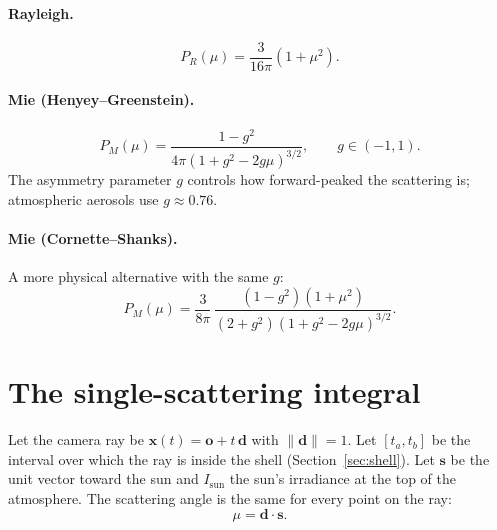\documentclass[11pt]{article}
\newcommand{\vect}[1]{\mathbf{#1}}
\begin{document}
\paragraph{Rayleigh.}
\begin{equation}
  P_R(\mu) = \frac{3}{16\pi}\left(1 + \mu^2\right).
  \label{eq:phase_rayleigh}
\end{equation}

\paragraph{Mie (Henyey--Greenstein).}
\begin{equation}
  P_M(\mu) = \frac{1 - g^2}{4\pi \left(1 + g^2 - 2 g \mu\right)^{3/2}},
  \qquad g \in (-1, 1).
  \label{eq:phase_hg}
\end{equation}
The asymmetry parameter $g$ controls how forward-peaked the scattering is;
atmospheric aerosols use $g \approx 0.76$.

\paragraph{Mie (Cornette--Shanks).} A more physical alternative with the same
$g$:
\begin{equation}
  P_M(\mu) = \frac{3}{8\pi}\,
             \frac{\left(1 - g^2\right)\left(1 + \mu^2\right)}
                  {\left(2 + g^2\right)\left(1 + g^2 - 2 g \mu\right)^{3/2}} .
  \label{eq:phase_cs}
\end{equation}

\section{The single-scattering integral}

Let the camera ray be $\vect{x}(t) = \vect{o} + t\,\vect{d}$ with
$\lVert\vect{d}\rVert = 1$. Let $[t_a, t_b]$ be the interval over which the ray is
inside the shell (Section~\ref{sec:shell}). Let $\vect{s}$ be the unit vector
toward the sun and $I_{\mathrm{sun}}$ the sun's irradiance at the top of the
atmosphere. The scattering angle is the same for every point on the ray:
\begin{equation}
  \mu = \vect{d} \cdot \vect{s}.
\end{equation}
\end{document}
